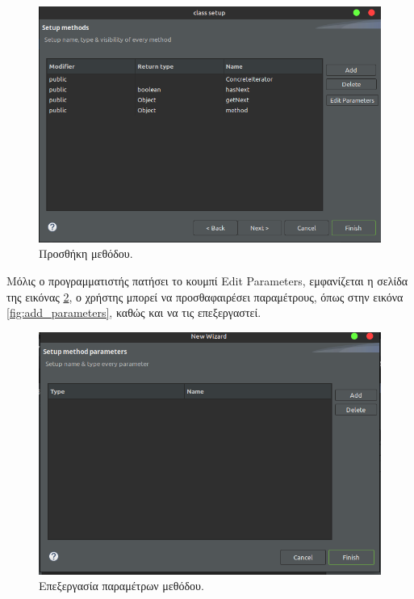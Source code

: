 \begin{figure}[H]
    \centering
    \includegraphics[width=1.0\textwidth]{Figures/add_method.png}
    \caption{Προσθήκη μεθόδου.}
    \label{fig:add_method}
\end{figure}
Μόλις ο προγραμματιστής πατήσει το κουμπί Edit Parameters, εμφανίζεται η σελίδα της εικόνας \ref{fig:edit_parameters}, 
ο χρήστης μπορεί να προσθαφαιρέσει παραμέτρους, όπως στην εικόνα \ref{fig:add_parameters}, καθώς και να τις επεξεργαστεί.
\begin{figure}[H]
    \centering
    \includegraphics[width=1.0\textwidth]{Figures/edit_parameters.png}
    \caption{Επεξεργασία παραμέτρων μεθόδου.}
    \label{fig:edit_parameters}
\end{figure}
